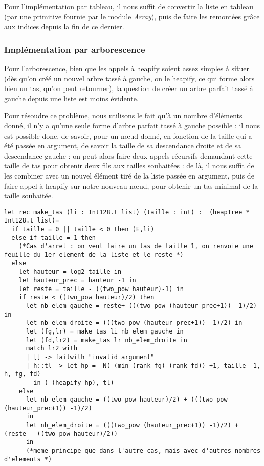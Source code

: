 \documentclass[12pt,a4paper]{article}
\begin{document}
Pour l'implémentation par tableau, il nous suffit de convertir la liste en tableau (par une primitive fournie par le module \textit{Array}), puis de faire les remontées grâce aux indices depuis la fin de ce dernier.

\subsubsection{Implémentation par arborescence}

Pour l'arborescence, bien que les appels à heapify soient assez simples à situer (dès qu'on créé un nouvel arbre tassé à gauche, on le heapify, ce qui forme alors bien un tas, qu'on peut retourner), la question de créer un arbre parfait tassé à gauche depuis une liste est moins évidente.

Pour résoudre ce problème, nous utilisons le fait qu'à un nombre d'éléments donné, il n'y a qu'une seule forme d'arbre parfait tassé à gauche possible : il nous est possible donc, de savoir, pour un nœud donné, en fonction de la taille qui a été passée en argument, de savoir la taille de sa descendance droite et de sa descendance gauche : on peut alors faire deux appels récursifs demandant cette taille de tas pour obtenir deux fils aux tailles souhaitées : de là, il nous suffit de les combiner avec un nouvel élément tiré de la liste passée en argument, puis de faire appel à heapify sur notre nouveau nœud, pour obtenir un tas minimal de la taille souhaitée.

\begin{lstlisting}
let rec make_tas (li : Int128.t list) (taille : int) :  (heapTree * Int128.t list)= 
  if taille = 0 || taille < 0 then (E,li)
  else if taille = 1 then
    (*Cas d'arret : on veut faire un tas de taille 1, on renvoie une feuille du 1er element de la liste et le reste *)
  else
    let hauteur = log2 taille in
    let hauteur_prec = hauteur -1 in
    let reste = taille - ((two_pow hauteur)-1) in 
    if reste < ((two_pow hauteur)/2) then
      let nb_elem_gauche = reste+ (((two_pow (hauteur_prec+1)) -1)/2) in
      let nb_elem_droite = (((two_pow (hauteur_prec+1)) -1)/2) in
      let (fg,lr) = make_tas li nb_elem_gauche in
      let (fd,lr2) = make_tas lr nb_elem_droite in
      match lr2 with 
      | [] -> failwith "invalid argument"
      | h::tl -> let hp =  N( (min (rank fg) (rank fd)) +1, taille -1, h, fg, fd) 
      	in ( (heapify hp), tl)  
    else
      let nb_elem_gauche = ((two_pow hauteur)/2) + (((two_pow (hauteur_prec+1)) -1)/2) 
      in
      let nb_elem_droite = (((two_pow (hauteur_prec+1)) -1)/2) + (reste - ((two_pow hauteur)/2))
      in
      (*meme principe que dans l'autre cas, mais avec d'autres nombres d'elements *)

\end{lstlisting}
\end{document}
